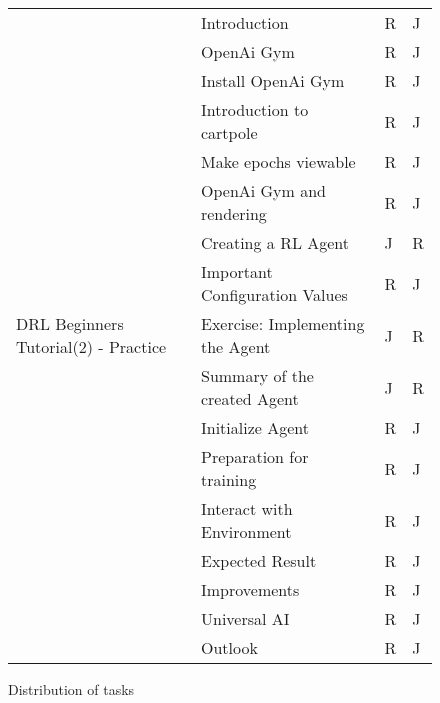 \documentclass[a4paper]{article}
\begin{document}
\begin{figure}[h!]
\begin{center}
\begin{tabular}{ |l|l|l|l| }
					\multirow{17}{*}{DRL Beginners Tutorial(2) - Practice} & Introduction & R & J \\
					& OpenAi Gym & R & J \\
					& Install OpenAi Gym & R & J\\ 
					& Introduction to cartpole & R & J \\
					& Make epochs viewable & R & J \\
					& OpenAi Gym and rendering & R & J \\
					& Creating a RL Agent & J & R \\
					& Important Configuration Values & R & J \\
					& Exercise: Implementing the Agent & J & R \\
					& Summary of the created Agent & J & R \\
					& Initialize Agent & R & J \\
					& Preparation for training & R & J \\
					& Interact with Environment & R & J \\
					& Expected Result & R & J \\
					& Improvements & R & J \\
					& Universal AI & R & J \\
					& Outlook & R & J \\
					\hline	
				\end{tabular}
				\caption{Distribution of tasks}
				\label{tasks}
			\end{center}
		\end{figure}
		
	
\end{document}
